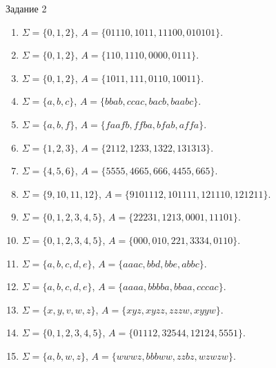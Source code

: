 Задание 2
\begin{enumerate}
\item $\Sigma = \{0,1,2\}$, $A = \{01110, 1011, 11100, 010101\}$.
\item $\Sigma = \{0,1,2\}$, $A = \{110, 1110, 0000, 0111\}$.
\item $\Sigma = \{0,1,2\}$, $A = \{1011, 111, 0110, 10011\}$.
\item $\Sigma = \{a,b,c\}$, $A = \{bbab, ccac, bacb, baabc\}$.
\item $\Sigma = \{a,b,f\}$, $A = \{faafb, ffba, bfab, affa\}$.
\item $\Sigma = \{1,2,3\}$, $A = \{2112, 1233, 1322, 131313\}$.
\item $\Sigma = \{4,5,6\}$, $A = \{5555, 4665, 666, 4455, 665\}$.
\item $\Sigma = \{9,10,11,12\}$, $A = \{9101112, 101111, 121110, 121211\}$.
\item $\Sigma = \{0,1,2,3,4,5\}$, $A = \{22231, 1213, 0001, 11101\}$.
\item $\Sigma = \{0,1,2,3,4,5\}$, $A = \{000, 010, 221, 3334, 0110\}$.
\item $\Sigma = \{a,b,c,d,e\}$, $A = \{aaac, bbd, bbe, abbc\}$.
\item $\Sigma = \{a,b,c,d,e\}$, $A = \{aaaa, bbbba, bbaa, cccac\}$.
\item $\Sigma = \{x,y,v,w,z\}$, $A = \{xyz, xyzz, zzzw, xyyw\}$.
\item $\Sigma = \{0,1,2,3,4,5\}$, $A = \{01112, 32544, 12124, 5551\}$.
\item $\Sigma = \{a,b,w,z\}$, $A = \{wwwz, bbbww,zzbz,wzwzw\}$.


\end{enumerate}
